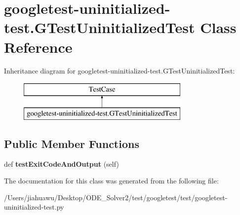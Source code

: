 \hypertarget{classgoogletest-uninitialized-test_1_1_g_test_uninitialized_test}{}\section{googletest-\/uninitialized-\/test.G\+Test\+Uninitialized\+Test Class Reference}
\label{classgoogletest-uninitialized-test_1_1_g_test_uninitialized_test}
Inheritance diagram for googletest-\/uninitialized-\/test.G\+Test\+Uninitialized\+Test\+:\begin{figure}[H]
\begin{center}
\leavevmode
\includegraphics[height=2.000000cm]{classgoogletest-uninitialized-test_1_1_g_test_uninitialized_test}
\end{center}
\end{figure}
\subsection*{Public Member Functions}
\begin{DoxyCompactItemize}
\item 
\mbox{\label{classgoogletest-uninitialized-test_1_1_g_test_uninitialized_test_aa3c5445f3d94a94d9b252fd64f05e4a0}} 
def {\bfseries test\+Exit\+Code\+And\+Output} (self)
\end{DoxyCompactItemize}


The documentation for this class was generated from the following file\+:\begin{DoxyCompactItemize}
\item 
/\+Users/jiahuawu/\+Desktop/\+O\+D\+E\+\_\+\+Solver2/test/googletest/test/googletest-\/uninitialized-\/test.\+py\end{DoxyCompactItemize}
